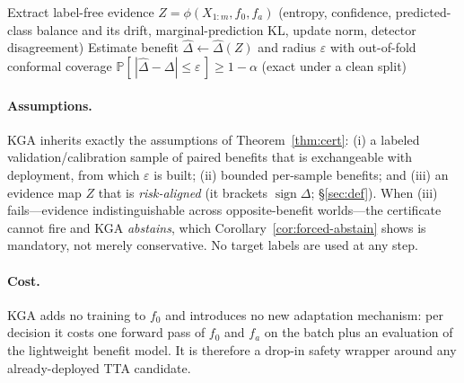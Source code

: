 \documentclass[conference]{IEEEtran}
\theoremstyle{plain}
\theoremstyle{definition}
\renewcommand{\Pr}{\mathbb{P}}
\newcommand{\sign}{\operatorname{sign}}
\begin{document}
\begin{algorithm}[t]
\caption{\textsc{KGA} (Knowability-Guided Adaptation)}
\label{alg:kga}
Extract label-free evidence $Z=\phi(X_{1:m},f_0,f_a)$ (entropy, confidence, predicted-class balance and its drift, marginal-prediction KL, update norm, detector disagreement)\;
Estimate benefit $\widehat\Delta\leftarrow\widehat\Delta(Z)$ and radius $\varepsilon$ with out-of-fold conformal coverage $\Pr[\,|\widehat\Delta-\Delta|\le\varepsilon\,]\ge1-\alpha$ (exact under a clean split)\;
\end{algorithm}

\paragraph{Assumptions.} \textsc{KGA} inherits exactly the assumptions of
Theorem~\ref{thm:cert}: (i) a labeled validation/calibration sample of paired benefits that is
exchangeable with deployment, from which $\varepsilon$ is built; (ii) bounded per-sample
benefits; and (iii) an evidence map $Z$ that is \emph{risk-aligned} (it brackets $\sign\Delta$;
\S\ref{sec:def}). When (iii) fails---evidence indistinguishable across opposite-benefit
worlds---the certificate cannot fire and \textsc{KGA} \emph{abstains}, which
Corollary~\ref{cor:forced-abstain} shows is mandatory, not merely conservative. No target
labels are used at any step.

\paragraph{Cost.} \textsc{KGA} adds no training to $f_0$ and introduces no new adaptation
mechanism: per decision it costs one forward pass of $f_0$ and $f_a$ on the batch plus an
evaluation of the lightweight benefit model. It is therefore a drop-in safety wrapper around
any already-deployed TTA candidate.
\end{document}
